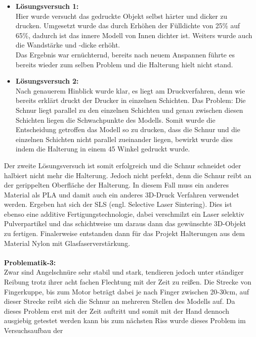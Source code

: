 \documentclass[titlepage,12pt,twoside]{article}
\begin{document}
\begin{itemize}
	\item \textbf{Lösungsversuch 1:} \\
	Hier wurde versucht das gedruckte Objekt selbst härter und dicker zu drucken. Umgesetzt wurde das durch Erhöhen der Fülldichte von 25\% auf 65\%, dadurch ist das innere Modell von Innen dichter ist. Weiters wurde auch die Wandstärke 
	und -dicke erhöht. \\
	Das Ergebnis war ernüchternd, bereits nach neuem Anspannen führte es bereits wieder zum selben Problem und die Halterung hielt nicht stand.
	\item \textbf{Lösungsversuch 2:} \\
	Nach genauerem Hinblick wurde klar, es liegt am Druckverfahren, denn wie bereits erklärt druckt der Drucker in einzelnen Schichten. Das Problem: Die Schnur liegt parallel zu den einzelnen Schichten und genau zwischen diesen Schichten 
	liegen die Schwachpunkte des Modells. Somit wurde die Entscheidung getroffen das Modell so zu drucken, dass die Schnur und die einzelnen Schichten nicht parallel zueinander liegen, bewirkt wurde dies indem die Halterung in einem 45\textdegree 
	Winkel gedruckt wurde.
\end{itemize}
\hfill \break
Der zweite Lösungsversuch ist somit erfolgreich und die Schnur schneidet oder halbiert nicht mehr die Halterung. Jedoch nicht perfekt, denn die Schnur reibt an der gerippelten Oberfläche der Halterung. In diesem Fall muss ein anderes Material als 
PLA und damit auch ein anderes 3D-Druck Verfahren verwendet werden. Ergeben hat sich der SLS (engl. Selective Laser Sintering). Dies ist ebenso eine additive Fertigungstechnologie, dabei verschmilzt ein Laser selektiv Pulverpartikel und das 
schichtweise um daraus dann das gewünschte 3D-Objekt zu fertigen. Finalerweise entstanden dann für das Projekt Halterungen aus dem Material Nylon mit Glasfaserverstärkung. \\ %
\\
\textbf{Problematik-3:} \\
Zwar sind Angelschnüre sehr stabil und stark, tendieren jedoch unter ständiger Reibung trotz ihrer acht fachen Flechtung mit der Zeit zu reißen. Die Strecke von Fingerkuppe, bis zum Motor beträgt dabei je nach Finger zwischen 20-30cm, 
auf dieser Strecke reibt sich die Schnur an mehreren Stellen des Modells auf. Da dieses Problem erst mit der Zeit auftritt und somit mit der Hand dennoch ausgiebig getestet werden kann bis zum nächsten Riss wurde dieses Problem im Versuchsaufbau der 
\end{document}
